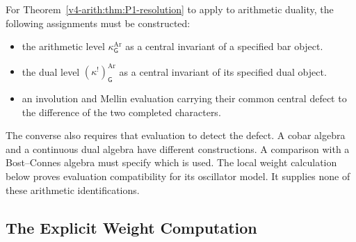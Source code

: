 For Theorem~\ref{v4-arith:thm:P1-resolution} to apply to arithmetic
duality, the following assignments must be constructed:
\begin{itemize}
\item the arithmetic level \(\kappa^{\mathrm{Ar}}_{\mathsf G}\)
as a central invariant of a specified bar object.
\item the dual level \((\kappa^!)^{\mathrm{Ar}}_{\mathsf G}\)
as a central invariant of its specified dual object.
\item an involution and Mellin evaluation carrying their common
central defect to the difference of the two completed characters.
\end{itemize}
The converse also requires that evaluation to detect the defect.
A cobar algebra and a continuous dual algebra have different
constructions. A comparison with a Bost--Connes algebra must specify
which is used. The local weight calculation below proves evaluation
compatibility for its oscillator model. It supplies none of these
arithmetic identifications.

\subsection{The Explicit Weight Computation}
\label{v4-arith:pos:weight-comp}

